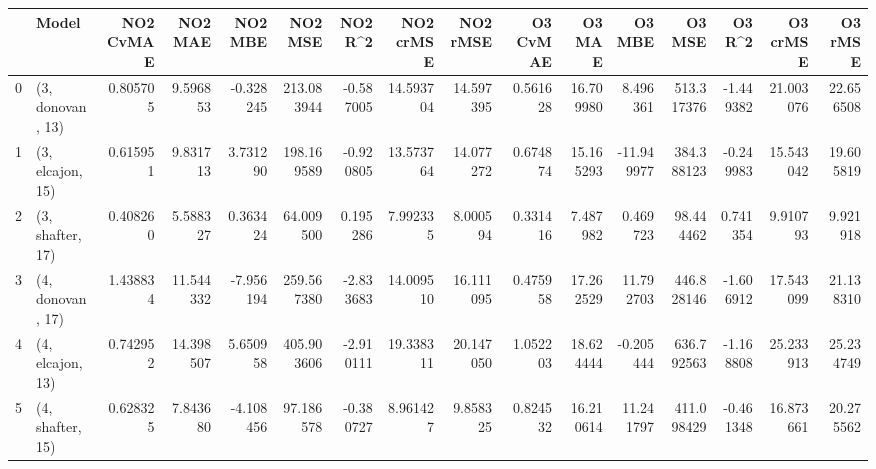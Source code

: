 \begin{tabular}{llrrrrrrrrrrrrrr}
\toprule
{} &             Model &  NO2 CvMAE &    NO2 MAE &   NO2 MBE &     NO2 MSE &   NO2 R\textasciicircum2 &  NO2 crMSE &   NO2 rMSE &  O3 CvMAE &     O3 MAE &     O3 MBE &      O3 MSE &    O3 R\textasciicircum2 &   O3 crMSE &    O3 rMSE \\
\midrule
0 &  (3, donovan, 13) &   0.805705 &   9.596853 & -0.328245 &  213.083944 & -0.587005 &  14.593704 &  14.597395 &  0.561628 &  16.709980 &   8.496361 &  513.317376 & -1.449382 &  21.003076 &  22.656508 \\
1 &  (3, elcajon, 15) &   0.615951 &   9.831713 &  3.731290 &  198.169589 & -0.920805 &  13.573764 &  14.077272 &  0.674874 &  15.165293 & -11.949977 &  384.388123 & -0.249983 &  15.543042 &  19.605819 \\
2 &  (3, shafter, 17) &   0.408260 &   5.588327 &  0.363424 &   64.009500 &  0.195286 &   7.992335 &   8.000594 &  0.331416 &   7.487982 &   0.469723 &   98.444462 &  0.741354 &   9.910793 &   9.921918 \\
3 &  (4, donovan, 17) &   1.438834 &  11.544332 & -7.956194 &  259.567380 & -2.833683 &  14.009510 &  16.111095 &  0.475958 &  17.262529 &  11.792703 &  446.828146 & -1.606912 &  17.543099 &  21.138310 \\
4 &  (4, elcajon, 13) &   0.742952 &  14.398507 &  5.650958 &  405.903606 & -2.910111 &  19.338311 &  20.147050 &  1.052203 &  18.624444 &  -0.205444 &  636.792563 & -1.168808 &  25.233913 &  25.234749 \\
5 &  (4, shafter, 15) &   0.628325 &   7.843680 & -4.108456 &   97.186578 & -0.380727 &   8.961427 &   9.858325 &  0.824532 &  16.210614 &  11.241797 &  411.098429 & -0.461348 &  16.873661 &  20.275562 \\
\bottomrule
\end{tabular}
